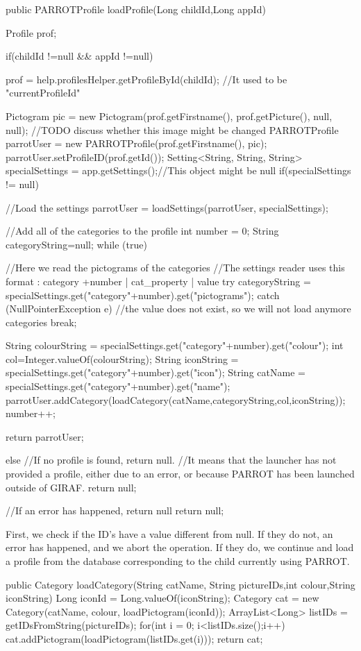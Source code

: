 \begin{source}{}
public PARROTProfile loadProfile(Long childId,Long appId)	
	{
		Profile prof;

		if(childId !=null && appId !=null)
		{
			prof = help.profilesHelper.getProfileById(childId);	//It used to be "currentProfileId"

			Pictogram pic = new Pictogram(prof.getFirstname(), prof.getPicture(), null, null);	//TODO discuss whether this image might be changed
			PARROTProfile parrotUser = new PARROTProfile(prof.getFirstname(), pic);
			parrotUser.setProfileID(prof.getId());
			Setting<String, String, String> specialSettings = app.getSettings();//This object might be null
			if(specialSettings != null)
			{
				//Load the settings
				parrotUser = loadSettings(parrotUser, specialSettings);

				//Add all of the categories to the profile
				int number = 0;
				String categoryString=null;
				while (true)
				{
					//Here we read the pictograms of the categories
					//The settings reader uses this format : category +number | cat_property | value
					try
					{
						categoryString = specialSettings.get("category"+number).get("pictograms");
					}
					catch (NullPointerException e)
					{
						//the value does not exist, so we will not load anymore categories
						break;
					}

					String colourString = specialSettings.get("category"+number).get("colour");
					int col=Integer.valueOf(colourString);
					String iconString = specialSettings.get("category"+number).get("icon");
					String catName = specialSettings.get("category"+number).get("name");
					parrotUser.addCategory(loadCategory(catName,categoryString,col,iconString));
					number++;
				}

				return parrotUser;
			}
			else
			{
				//If no profile is found, return null.
				//It means that the launcher has not provided a profile, either due to an error, or because PARROT has been launched outside of GIRAF.
				return null;
			}
		}
		//If an error has happened, return null
		return null;


	}
\end{source}
First, we check if the ID's have a value different from null. If they do not, an error has happened, and we abort the operation. If they do, we continue and load a profile from the database corresponding to the child currently using PARROT.

\begin{source}{}
	public Category loadCategory(String catName, String pictureIDs,int colour,String iconString)
	{
		Long iconId = Long.valueOf(iconString);
		Category cat = new Category(catName, colour, loadPictogram(iconId));
		ArrayList<Long> listIDs = getIDsFromString(pictureIDs);
		for(int i = 0; i<listIDs.size();i++)
		{
			cat.addPictogram(loadPictogram(listIDs.get(i)));
		}
		return cat;
	}
\end{source}


